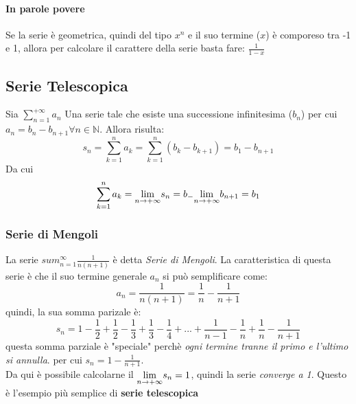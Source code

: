 \documentclass[12pt, a4paper, openany]{book}
\begin{document}
	\paragraph{In parole povere}
	Se la serie è geometrica, quindi del tipo $x^n$ e il suo termine ($x$) è comporeso tra -1 e 1, allora per calcolare il carattere della serie basta fare: $\frac{1}{1-x}$
	\\
	\subsection{Serie Telescopica}
	Sia $\sum_{n=1}^{+\infty} a_n$ Una serie tale che esiste una successione infinitesima ($b_n$) per cui $a_n = b_n - b_{n+1} \forall n\in \mathbb{N}$.
	Allora risulta:
	\begin{equation*}
		s_n = \sum_{k=1}^{n}a_k = \sum_{k=1}^n (b_k - b_{k+1}) = b_1 - b_{n+1}
	\end{equation*}
	Da cui
	\begin{equation*}
		\sum_{k=1}^{n}a_k = \underset{n \to +\infty}{\lim} s_n = b_ - \underset{n \to +\infty}{\lim} b_{n+1} = b_1
	\end{equation*}

	\subsubsection*{Serie di Mengoli}
	La serie $sum_{n=1}^\infty \frac{1}{n(n+1)}$ è detta \emph{Serie di Mengoli}.
	La caratteristica di questa serie è che il suo termine generale $a_n$ si può semplificare come:
	\begin{equation*}
		a_n = \frac{1}{n(n+1)} = \frac{1}{n} - \frac{1}{n+1}
	\end{equation*}
	quindi, la sua somma parizale è:
	\begin{equation*}
		s_n = 1 - \frac{1}{2} + \frac{1}{2} - \frac{1}{3} +  \frac{1}{3} - \frac{1}{4} + ... +  \frac{1}{n-1} - \frac{1}{n} +  \frac{1}{n} - \frac{1}{n+1}
	\end{equation*}
	questa somma parziale è "speciale" perchè \emph{ogni termine tranne il primo e l'ultimo si annulla}. per cui $s_n = 1 - \frac{1}{n+1}$.
	\\Da qui è possibile calcolarne il $\underset{n \to +\infty}{\lim} s_n = 1$, quindi la serie \emph{converge a 1}.
	Questo è l'esempio più semplice di \textbf{serie telescopica}
\end{document}
